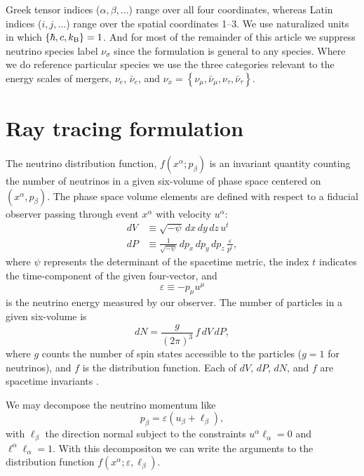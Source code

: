 \documentclass[aps,floatfix,prd,superscriptaddress,twocolumn]{revtex4-1}
\begin{document}
Greek tensor indices ($\alpha, \beta, ...$) range over all four coordinates,
whereas Latin indices ($i, j, ...$) range over the spatial coordinates 1--3.
We use naturalized units in which $\{\hbar,c,k_{\rm B}\}=1$.
And for most of the remainder of this article we suppress neutrino species label
$\nu_\sigma$ since the formulation is general to any species.
Where we do reference particular species we use the three categories
relevant to the energy scales of mergers, $\nu_e$, $\bar{\nu}_e$, and
$\nu_x=\left\{\nu_\mu,\bar{\nu}_\mu,\nu_\tau,\bar{\nu}_\tau\right\}$.

\section{Ray tracing formulation}
\label{sec:formulation}
The neutrino distribution function, $f(x^\alpha; p_\beta)$ is an invariant
quantity counting the number of neutrinos in a given six-volume of phase
space centered on $(x^\alpha,p_\beta)$.
The phase space volume elements are defined with respect to a fiducial
observer passing through event $x^\alpha$ with velocity $u^\alpha$:
\begin{align}
  \label{eqn:dV}
  dV & \equiv \sqrt{-\psi} \, dx \, dy \, dz \, u^t \\
  \label{eqn:dP}
  dP & \equiv \frac{1}{\sqrt{-\psi}} \, dp_x \, dp_y \, dp_z \,
  \frac{\varepsilon}{p^t},
\end{align}
where $\psi$ represents the determinant of the spacetime metric,
the index $t$ indicates the time-component of the given four-vector, and
\begin{equation}
  \label{eqn:varepsilon}
  \varepsilon \equiv -p_\mu u^\mu
\end{equation}
is the neutrino energy measured by our observer.
The number of particles in a given six-volume is
\begin{equation}
  dN=\frac{g}{(2\pi)^3}\,f\,dV\,dP,
\end{equation}
where $g$ counts the number of spin states accessible to the
particles ($g=1$ for neutrinos), and $f$ is the distribution function.
Each of $dV$, $dP$, $dN$, and $f$ are spacetime invariants
\citep{debb2009-gr_boltzmann_1, debb2009-gr_boltzmann_2, lind1966-gr_boltzmann}.

We may decompose the neutrino momentum like
\begin{equation}
  \label{eqn:def_momentum}
  p_\beta = \varepsilon (u_\beta + \ell_\beta),
\end{equation}
with $\ell_\beta$ the direction normal subject to the constraints
$u^\alpha \ell_\alpha = 0$ and $\ell^\alpha \ell_\alpha=1$.
With this decompositon we can write the arguments to the distribution function
$f(x^\alpha;\varepsilon,\ell_\beta)$.
\end{document}
